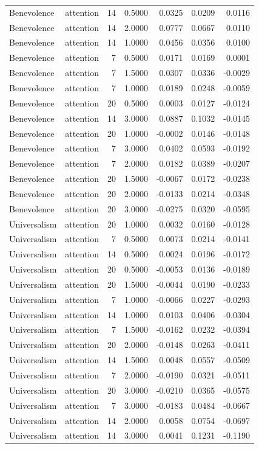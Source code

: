 \begin{tabular}{llrrrrr}
Benevolence & attention & 14 & 0.5000 & 0.0325 & 0.0209 & 0.0116 \\
Benevolence & attention & 14 & 2.0000 & 0.0777 & 0.0667 & 0.0110 \\
Benevolence & attention & 14 & 1.0000 & 0.0456 & 0.0356 & 0.0100 \\
Benevolence & attention & 7 & 0.5000 & 0.0171 & 0.0169 & 0.0001 \\
Benevolence & attention & 7 & 1.5000 & 0.0307 & 0.0336 & -0.0029 \\
Benevolence & attention & 7 & 1.0000 & 0.0189 & 0.0248 & -0.0059 \\
Benevolence & attention & 20 & 0.5000 & 0.0003 & 0.0127 & -0.0124 \\
Benevolence & attention & 14 & 3.0000 & 0.0887 & 0.1032 & -0.0145 \\
Benevolence & attention & 20 & 1.0000 & -0.0002 & 0.0146 & -0.0148 \\
Benevolence & attention & 7 & 3.0000 & 0.0402 & 0.0593 & -0.0192 \\
Benevolence & attention & 7 & 2.0000 & 0.0182 & 0.0389 & -0.0207 \\
Benevolence & attention & 20 & 1.5000 & -0.0067 & 0.0172 & -0.0238 \\
Benevolence & attention & 20 & 2.0000 & -0.0133 & 0.0214 & -0.0348 \\
Benevolence & attention & 20 & 3.0000 & -0.0275 & 0.0320 & -0.0595 \\
Universalism & attention & 20 & 1.0000 & 0.0032 & 0.0160 & -0.0128 \\
Universalism & attention & 7 & 0.5000 & 0.0073 & 0.0214 & -0.0141 \\
Universalism & attention & 14 & 0.5000 & 0.0024 & 0.0196 & -0.0172 \\
Universalism & attention & 20 & 0.5000 & -0.0053 & 0.0136 & -0.0189 \\
Universalism & attention & 20 & 1.5000 & -0.0044 & 0.0190 & -0.0233 \\
Universalism & attention & 7 & 1.0000 & -0.0066 & 0.0227 & -0.0293 \\
Universalism & attention & 14 & 1.0000 & 0.0103 & 0.0406 & -0.0304 \\
Universalism & attention & 7 & 1.5000 & -0.0162 & 0.0232 & -0.0394 \\
Universalism & attention & 20 & 2.0000 & -0.0148 & 0.0263 & -0.0411 \\
Universalism & attention & 14 & 1.5000 & 0.0048 & 0.0557 & -0.0509 \\
Universalism & attention & 7 & 2.0000 & -0.0190 & 0.0321 & -0.0511 \\
Universalism & attention & 20 & 3.0000 & -0.0210 & 0.0365 & -0.0575 \\
Universalism & attention & 7 & 3.0000 & -0.0183 & 0.0484 & -0.0667 \\
Universalism & attention & 14 & 2.0000 & 0.0058 & 0.0754 & -0.0697 \\
Universalism & attention & 14 & 3.0000 & 0.0041 & 0.1231 & -0.1190 \\
\bottomrule
\end{tabular}
